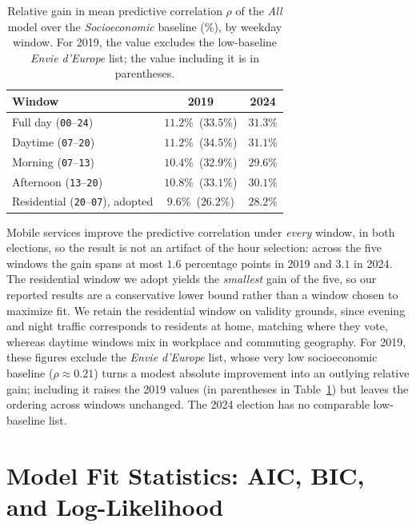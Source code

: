 \documentclass[9pt,sigconf,letterpaper]{acmart}
\newcommand{\socioeconomic}{\emph{Socioeconomic}\xspace}
\newcommand{\all}{\emph{All}\xspace}
\begin{document}
\begin{table}[h!]
\centering
\caption{Relative gain in mean predictive correlation $\rho$ of the \all model over the \socioeconomic baseline (\%), by weekday window. For 2019, the value excludes the low-baseline \textit{Envie d'Europe} list; the value including it is in parentheses.
\label{tab:time-sensitivity}}
\begin{tabular}{l c c}
\toprule
\textbf{Window} & \textbf{2019} & \textbf{2024} \\
\midrule
Full day (\texttt{00}--\texttt{24})       & $11.2\%$ \,($33.5\%$) & $31.3\%$ \\
Daytime (\texttt{07}--\texttt{20})        & $11.2\%$ \,($34.5\%$) & $31.1\%$ \\
Morning (\texttt{07}--\texttt{13})        & $10.4\%$ \,($32.9\%$) & $29.6\%$ \\
Afternoon (\texttt{13}--\texttt{20})      & $10.8\%$ \,($33.1\%$) & $30.1\%$ \\
\rowcolor{blue!8}
Residential (\texttt{20}--\texttt{07}), adopted & $9.6\%$ \,($26.2\%$) & $28.2\%$ \\
\bottomrule
\end{tabular}
\end{table}

Mobile services improve the predictive correlation under \emph{every} window, in both elections, so the result is not an artifact of the hour selection: across the five windows the gain spans at most $1.6$ percentage points in 2019 and $3.1$ in 2024.
The residential window we adopt yields the \emph{smallest} gain of the five, so our reported results are a conservative lower bound rather than a window chosen to maximize fit. 
We retain the residential window on validity grounds, since evening and night traffic corresponds to residents at home, matching where they vote, whereas daytime windows mix in workplace and commuting geography.
For 2019, these figures exclude the \textit{Envie d'Europe} list, whose very low socioeconomic baseline ($\rho \approx 0.21$) turns a modest absolute improvement into an outlying relative gain; including it raises the 2019 values (in parentheses in Table~\ref{tab:time-sensitivity}) but leaves the ordering across windows unchanged. The 2024 election has no comparable low-baseline list.


\section{Model Fit Statistics: AIC, BIC, and Log-Likelihood}
\label{app:aic-bic}
\end{document}
